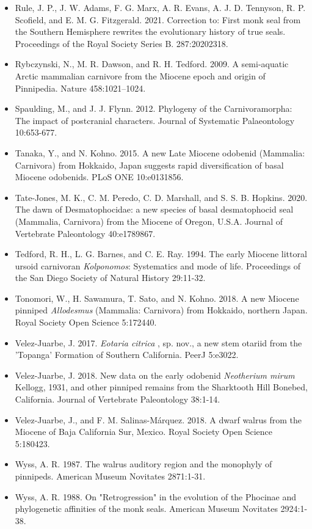 \documentclass[a4paper, 12pt]{article}
\begin{document}
\begin{itemize}
\item Rule, J. P., J. W. Adams, F. G. Marx, A. R. Evans, A. J. D. Tennyson, R. P. Scofield, and E. M. G. Fitzgerald. 2021. Correction to: First monk seal from the Southern Hemisphere rewrites the evolutionary history of true seals. Proceedings of the Royal Society Series B. 287:20202318. 
\item Rybczynski, N., M. R. Dawson, and R. H. Tedford. 2009. A semi-aquatic Arctic mammalian carnivore from the Miocene epoch and origin of Pinnipedia. Nature 458:1021–1024.
\item Spaulding, M., and J. J. Flynn. 2012. Phylogeny of the Carnivoramorpha: The impact of postcranial characters. Journal of Systematic Palaeontology 10:653-677. 
\item Tanaka, Y., and N. Kohno. 2015. A new Late Miocene odobenid (Mammalia: Carnivora) from Hokkaido, Japan suggests rapid diversification of basal Miocene odobenids. PLoS ONE 10:e0131856.
\item Tate-Jones, M. K., C. M. Peredo, C. D. Marshall, and S. S. B. Hopkins. 2020. The dawn of Desmatophocidae: a new species of basal desmatophocid seal (Mammalia, Carnivora) from the Miocene of Oregon, U.S.A. Journal of Vertebrate Paleontology 40:e1789867.
\item Tedford, R. H., L. G. Barnes, and C. E. Ray. 1994. The early Miocene littoral ursoid carnivoran \textit{Kolponomos}: Systematics and mode of life. Proceedings of the San Diego Society of Natural History 29:11-32. 
\item Tonomori, W., H. Sawamura, T. Sato, and N. Kohno. 2018. A new Miocene pinniped \textit{Allodesmus} (Mammalia: Carnivora) from Hokkaido, northern Japan. Royal Society Open Science 5:172440.
\item Velez-Juarbe, J. 2017. \textit{Eotaria citrica} , sp. nov., a new stem otariid from the 'Topanga' Formation of Southern California. PeerJ 5:e3022.
\item Velez-Juarbe, J. 2018. New data on the early odobenid \textit{Neotherium mirum} Kellogg, 1931, and other pinniped remains from the Sharktooth Hill Bonebed, California. Journal of Vertebrate Paleontology 38:1-14.
\item Velez-Juarbe, J., and F. M. Salinas-M\'{a}rquez. 2018. A dwarf walrus from the Miocene of Baja California Sur, Mexico. Royal Society Open Science 5:180423.
\item Wyss, A. R. 1987. The walrus auditory region and the monophyly of pinnipeds. American Museum Novitates 2871:1-31. 
\item Wyss, A. R. 1988. On "Retrogression" in the evolution of the Phocinae and phylogenetic affinities of the monk seals. American Museum Novitates 2924:1-38. 
\end{itemize}
\end{document}
